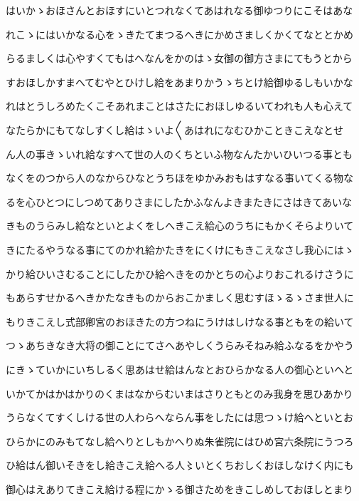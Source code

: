 \documentclass[a4paper,11pt,landscape]{ltjtarticle}
\begin{document}
\par\medskip
はいかゝおほさんとおほすにいとつれなくてあはれなる御ゆつりにこそはあな
\par\medskip
れこゝにはいかなる心をゝきたてまつるへきにかめさましくかくてなととかめ
\par\medskip
らるましくは心やすくてもはへなんをかのはゝ女御の御方さまにてもうとから
\par\medskip
すおほしかすまへてむやとひけし給をあまりかうゝちとけ給御ゆるしもいかな
\par\medskip
れはとうしろめたくこそあれまことはさたにおほしゆるいてわれも人も心えて
\par\medskip
なたらかにもてなしすくし給はゝいよ〱あはれになむひかこときこえなとせ
\par\medskip
ん人の事きゝいれ給なすへて世の人のくちといふ物なんたかいひいつる事とも
\par\medskip
なくをのつから人のなからひなとうちほをゆかみおもはすなる事いてくる物な
\par\medskip
るを心ひとつにしつめてありさまにしたかふなんよきまたきにさはきてあいな
\par\medskip
きものうらみし給なといとよくをしへきこえ給心のうちにもかくそらよりいて
\par\medskip
きにたるやうなる事にてのかれ給かたきをにくけにもきこえなさし我心にはゝ
\par\medskip
かり給ひいさむることにしたかひ給へきをのかとちの心よりおこれるけさうに
\par\medskip
もあらすせかるへきかたなきものからおこかましく思むすほゝるゝさま世人に
\par\medskip
もりきこえし式部卿宮のおほきたの方つねにうけはしけなる事ともをの給いて
\par\medskip
つゝあちきなき大将の御ことにてさへあやしくうらみそねみ給ふなるをかやう
\par\medskip
にきゝていかにいちしるく思あはせ給はんなとおひらかなる人の御心といへと
\par\medskip
いかてかはかはかりのくまはなからむいまはさりともとのみ我身を思ひあかり
\par\medskip
うらなくてすくしける世の人わらへならん事をしたには思つゝけ給へといとお
\par\medskip
ひらかにのみもてなし給へりとしもかへりぬ朱雀院にはひめ宮六条院にうつろ
\par\medskip
ひ給はん御いそきをし給きこえ給へる人〻いとくちおしくおほしなけく内にも
\par\medskip
御心はえありてきこえ給ける程にかゝる御さためをきこしめしておほしとまり
\end{document}
